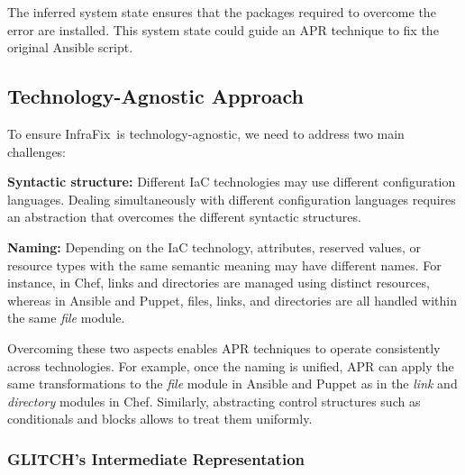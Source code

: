 \documentclass[sigconf,nonacm]{acmart}
\def\name{{\sc InfraFix}}
\begin{document}
The inferred system state ensures that the packages required to overcome the error are installed. This system state could guide an APR technique to fix the original Ansible script.


\subsection{Technology-Agnostic Approach}
\label{sec:tech-agnostic}

To ensure \name\ is technology-agnostic, we need to address two main challenges:
\begin{enumerate*}
    \item \textbf{Syntactic structure:} Different IaC technologies may use different configuration languages. Dealing simultaneously with different configuration languages requires an abstraction that overcomes the different syntactic structures.
    \item \textbf{Naming:} Depending on the IaC technology, attributes, reserved values, or resource types with the same semantic meaning may have different names. For instance, in Chef, links and directories are managed using distinct resources, whereas in Ansible and Puppet, files, links, and directories are all handled within the same \emph{file} module.
\end{enumerate*}

Overcoming these two aspects enables APR techniques to operate consistently across technologies. For example, once the naming is unified, APR can apply the same transformations to the \emph{file} module in Ansible and Puppet as in the \emph{link} and \emph{directory} modules in Chef. Similarly, abstracting control structures such as conditionals and blocks allows to treat them uniformly.

\subsubsection{GLITCH's Intermediate Representation} 
\end{document}
